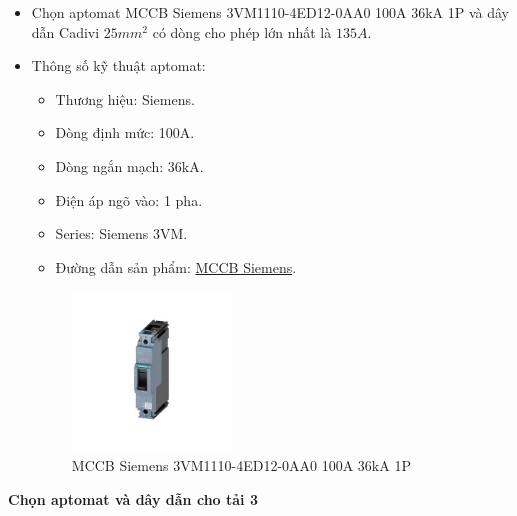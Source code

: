                 \begin{itemize}
                    \item Chọn aptomat MCCB Siemens 3VM1110-4ED12-0AA0 100A 36kA 1P và dây dẫn Cadivi $25mm^2$ có dòng cho phép lớn nhất là $135A$.
                    \item Thông số kỹ thuật aptomat:
                        \begin{itemize}
                            \item Thương hiệu: Siemens.
                            \item Dòng định mức: 100A.
                            \item Dòng ngắn mạch: 36kA.
                            \item Điện áp ngõ vào: 1 pha.
                            \item Series: Siemens 3VM.
                            \item Đường dẫn sản phẩm: \href{https://codienhaiau.com/product/mccb-siemens-3vm1110-4ed12-0aa0-100a-36ka-1p/}{MCCB Siemens}.
                        \end{itemize}
                        \begin{figure}[H]
                            \centering
                            \includegraphics[width=0.4\textwidth]{pictures/2m.png}
                            \caption{MCCB Siemens 3VM1110-4ED12-0AA0 100A 36kA 1P}
                        \end{figure}
                \end{itemize}
            \textbf{Chọn aptomat và dây dẫn cho tải 3}
